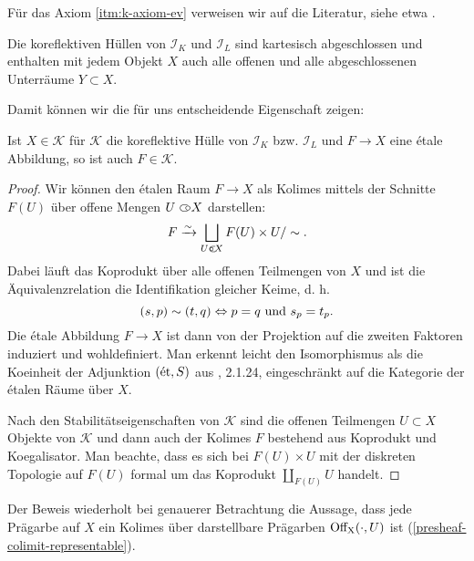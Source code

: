 Für das Axiom \ref{itm:k-axiom-ev} verweisen wir auf die Literatur,
siehe etwa \cite{??}.

\begin{kor}
  Die koreflektiven Hüllen von $\mathcal{I}_K$ und $\mathcal{I}_L$
  sind kartesisch abgeschlossen und enthalten mit jedem Objekt $X$
  auch alle offenen und alle abgeschlossenen Unterräume $Y \subset X$.
\end{kor}

Damit können wir die für uns entscheidende Eigenschaft zeigen:
\begin{prop} \label{k-etale-closed}
  Ist $X \in \mathcal{K}$ für $\mathcal{K}$ die koreflektive Hülle von
  $\mathcal{I}_K$ bzw. $\mathcal{I}_L$ und $F \to X$ eine étale
  Abbildung, so ist auch $F \in \mathcal{K}$.
\end{prop}
\begin{proof}
  Wir können den étalen Raum $F \to X$ als Kolimes mittels der
  Schnitte $F(U)$ über offene Mengen $U \subset\kern-0.58em\circ X$ darstellen:
  \[ F \xrightarrow[]{\sim} \bigsqcup_{U \subset\kern-0.58em\circ X} F(U) \times U / \sim. \]
  Dabei läuft das Koprodukt über alle offenen Teilmengen von $X$ und
  ist die Äquivalenzrelation die Identifikation gleicher Keime, d. h.
  \[ (s, p) \sim (t, q) \Leftrightarrow p = q \text{ und } s_p = t_p. \]
  Die étale Abbildung $F \to X$ ist dann von der Projektion auf die
  zweiten Faktoren induziert und wohldefiniert. Man erkennt leicht den
  Isomorphismus als die Koeinheit der Adjunktion $(\mathrm{\acute{e}t}, S)$ aus
  \cite{TG}, 2.1.24, eingeschränkt auf die Kategorie der étalen Räume
  über $X$.

  Nach den Stabilitätseigenschaften von $\mathcal{K}$ sind die offenen
  Teilmengen $U \subset X$ Objekte von $\mathcal{K}$ und dann auch der
  Kolimes $F$ bestehend aus Koprodukt und Koegalisator. Man beachte,
  dass es sich bei $F(U) \times U$ mit der diskreten Topologie auf
  $F(U)$ formal um das Koprodukt $\coprod_{F(U)} U$ handelt.
\end{proof}
\begin{bem}
  Der Beweis wiederholt bei genauerer Betrachtung die Aussage, dass
  jede Prägarbe auf $X$ ein Kolimes über darstellbare Prägarben
  $\operatorname{Off_X}(\cdot, U)$ ist (\ref{presheaf-colimit-representable}).
\end{bem}

